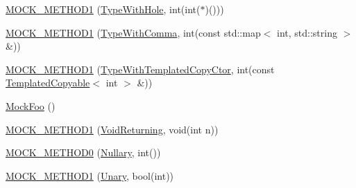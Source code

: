 \begin{DoxyCompactItemize}
\item 
\mbox{\hyperlink{classtesting_1_1gmock__generated__function__mockers__test_1_1_mock_foo_a33077a71c1c5178c25b0a4aa099d5f2c}{M\+O\+C\+K\+\_\+\+M\+E\+T\+H\+O\+D1}} (\mbox{\hyperlink{classtesting_1_1gmock__generated__function__mockers__test_1_1_foo_interface_a9e92ef227dc68806f85ebff9c8a6102a}{Type\+With\+Hole}}, int(int($\ast$)()))
\item 
\mbox{\hyperlink{classtesting_1_1gmock__generated__function__mockers__test_1_1_mock_foo_a3774adcc0155dd4c3b5fd790a6f40261}{M\+O\+C\+K\+\_\+\+M\+E\+T\+H\+O\+D1}} (\mbox{\hyperlink{classtesting_1_1gmock__generated__function__mockers__test_1_1_foo_interface_a64544adcb9c502a8fbc3990b53f4c767}{Type\+With\+Comma}}, int(const std\+::map$<$ int, std\+::string $>$ \&))
\item 
\mbox{\hyperlink{classtesting_1_1gmock__generated__function__mockers__test_1_1_mock_foo_afabde8ab238dcae147e72b16c246416d}{M\+O\+C\+K\+\_\+\+M\+E\+T\+H\+O\+D1}} (\mbox{\hyperlink{classtesting_1_1gmock__generated__function__mockers__test_1_1_foo_interface_ac3f47b680d4a46f2a77ebd76b7243187}{Type\+With\+Templated\+Copy\+Ctor}}, int(const \mbox{\hyperlink{classtesting_1_1gmock__generated__function__mockers__test_1_1_templated_copyable}{Templated\+Copyable}}$<$ int $>$ \&))
\item 
\mbox{\hyperlink{classtesting_1_1gmock__generated__function__mockers__test_1_1_mock_foo_a05d4aeb00d75b5dbf627a5db2c0ada7f}{Mock\+Foo}} ()
\item 
\mbox{\hyperlink{classtesting_1_1gmock__generated__function__mockers__test_1_1_mock_foo_a03e7f723e9909b031fc6df22f41aac7f}{M\+O\+C\+K\+\_\+\+M\+E\+T\+H\+O\+D1}} (\mbox{\hyperlink{classtesting_1_1gmock__generated__function__mockers__test_1_1_foo_interface_adf968115cf1260004d8abe372dc71c85}{Void\+Returning}}, void(int n))
\item 
\mbox{\hyperlink{classtesting_1_1gmock__generated__function__mockers__test_1_1_mock_foo_a25b99ec3b994318b7ecb0578da113136}{M\+O\+C\+K\+\_\+\+M\+E\+T\+H\+O\+D0}} (\mbox{\hyperlink{classtesting_1_1gmock__generated__function__mockers__test_1_1_foo_interface_a633e753eafa7f82dde22ecf9492f341c}{Nullary}}, int())
\item 
\mbox{\hyperlink{classtesting_1_1gmock__generated__function__mockers__test_1_1_mock_foo_a9f9ce709a5b13e319eeb348e6eae3d18}{M\+O\+C\+K\+\_\+\+M\+E\+T\+H\+O\+D1}} (\mbox{\hyperlink{classtesting_1_1gmock__generated__function__mockers__test_1_1_foo_interface_ae0885ac29bc4a3f180f6573d8b1a341e}{Unary}}, bool(int))
\item 

\end{DoxyCompactItemize}
